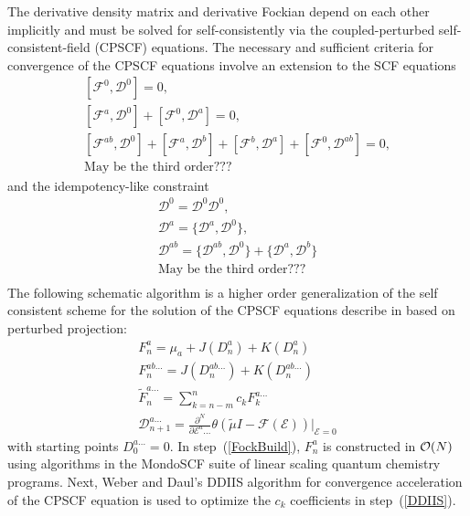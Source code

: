 \documentclass[prl,aps,twocolumn,showpacs,twocolumngrid,superbib]{revtex4}
\def\F{\mathcal{F}}
\def\D{\mathcal{D}}
\def\E{\mathcal{E}}
\begin{document}
The derivative density matrix and derivative Fockian depend on 
each other implicitly and must be solved for self-consistently 
via the coupled-perturbed self-consistent-field (CPSCF) equations.
The necessary and sufficient criteria for convergence of the 
CPSCF equations involve an extension to the SCF equations \cite{Furche_2001}
\begin{subequations}
  \begin{gather}
    [\F^{0} ,\D^{0}]=0,\\
    [\F^{a} ,\D^{0}]+[\F^{0},\D^{a}]=0,\\
    [\F^{ab},\D^{0}]+[\F^{a},\D^{b}]+[\F^{b} ,\D^{a}]+[\F^{0},\D^{ab}]=0,\\
    \text{May be the third order???}
  \end{gather}
\end{subequations}
and the idempotency-like constraint \cite{Furche_2001}
\begin{subequations}
  \begin{gather}
    \D^{0} =\D^{0} \D^{0},\\
    \D^{a} =\{\D^{a},\D^{0}\},\\
    \D^{ab}=\{\D^{ab},\D^{0}\}+\{\D^{a},\D^{b}\}\\
    \text{May be the third order???}\\
  \end{gather}
\end{subequations}
The following schematic algorithm is a higher order generalization of the
self consistent scheme for the solution of the CPSCF equations describe 
in \cite{Weber04} based on perturbed projection:
\begin{subequations}
  \begin{gather}
    F^{a}_{n}=\mu_a+J(D^{a}_n)+K(D^{a}_n) \label{FockBuild} \\
    F^{ab\ldots}_{n}=J(D^{ab\ldots}_n)+K(D^{ab\ldots}_n) \label{FockBuild2} \\
    \displaystyle\widetilde{F}^{a\ldots}_{n}=\sum_{k=n-m}^{n}c_k F^{a\ldots}_{k} \label{DDIIS} \\
    \displaystyle\D^{a\ldots}_{n+1}=
    \frac{\partial^N}{\partial\E^a\ldots}\theta(\tilde{\mu}I-
    \F(\E))\bigg|_{\E=0} \label{DDeriv}
  \end{gather} 
\end{subequations}
with starting points $D^{a\ldots}_0=0$. In step~(\ref{FockBuild}),  
$F^a_n$ is constructed in ${\cal O}(N)$ using algorithms 
\cite{MChallacombe97,ESchwegler97} in the {\sc MondoSCF} \cite{MondoSCF} 
suite of linear scaling quantum chemistry programs.  Next,
Weber and Daul's DDIIS algorithm for convergence acceleration 
of the CPSCF equation \cite{Weber_2003} is used to optimize 
the $c_k$ coefficients in step~(\ref{DDIIS}).
\end{document}
